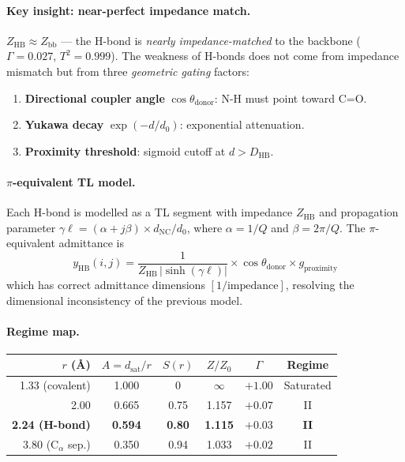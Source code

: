 \paragraph{Key insight: near-perfect impedance match.}
$Z_\text{HB} \approx Z_\text{bb}$ --- the H-bond is \emph{nearly
impedance-matched} to the backbone ($\Gamma = 0.027$, $T^2 = 0.999$).
The weakness of H-bonds does not come from impedance mismatch but
from three \emph{geometric gating} factors:
\begin{enumerate}
    \item \textbf{Directional coupler angle} $\cos\theta_\text{donor}$:
          N-H must point toward C=O.
    \item \textbf{Yukawa decay} $\exp(-d/d_0)$: exponential attenuation.
    \item \textbf{Proximity threshold}: sigmoid cutoff at $d > D_\text{HB}$.
\end{enumerate}

\paragraph{$\pi$-equivalent TL model.}
Each H-bond is modelled as a TL segment with impedance $Z_\text{HB}$
and propagation parameter
$\gamma\ell = (\alpha + j\beta) \times d_\text{NC}/d_0$,
where $\alpha = 1/Q$ and $\beta = 2\pi/Q$.  The $\pi$-equivalent
admittance is
\begin{equation}
    y_\text{HB}(i,j) = \frac{1}{Z_\text{HB}\,|\!\sinh(\gamma\ell)|}
    \times \cos\theta_\text{donor} \times g_\text{proximity}
    \label{eq:y_hb_pi}
\end{equation}
which has correct admittance dimensions $[1/\text{impedance}]$,
resolving the dimensional inconsistency of the previous model.

\paragraph{Regime map.}
\begin{center}
\begin{tabular}{rccccc}
\toprule
$r$ (\AA) & $A = d_\text{sat}/r$ & $S(r)$ & $Z/Z_0$ & $\Gamma$ & Regime \\
\midrule
1.33 (covalent) & 1.000 & 0    & $\infty$ & $+1.00$ & Saturated \\
2.00            & 0.665 & 0.75 & 1.157    & $+0.07$ & II \\
\textbf{2.24 (H-bond)} & \textbf{0.594} & \textbf{0.80} &
    \textbf{1.115} & \textbf{$+0.03$} & \textbf{II} \\
3.80 (C$_\alpha$ sep.) & 0.350 & 0.94 & 1.033 & $+0.02$ & II \\
\bottomrule
\end{tabular}
\end{center}

